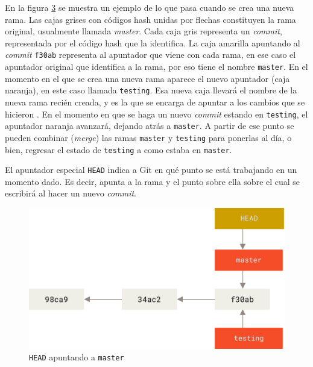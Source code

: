 \documentclass[spanish, 12pt, a4paper]{article}
\begin{document}
En la figura \protect\hyperlink{fig:two-branches}{3} se muestra un
ejemplo de lo que pasa cuando se crea una nueva rama. Las cajas grises
con códigos hash unidas por flechas constituyen la rama original,
usualmente llamada \emph{master}. Cada caja gris representa un
\emph{commit}, representada por el código hash que la identifica. La
caja amarilla apuntando al \emph{commit} \passthrough{\lstinline!f30ab!}
representa al apuntador que viene con cada rama, en ese caso el
apuntador original que identifica a la rama, por eso tiene el nombre
\passthrough{\lstinline!master!}. En el momento en el que se crea una
nueva rama aparece el nuevo apuntador (caja naranja), en este caso
llamada \passthrough{\lstinline!testing!}. Esa nueva caja llevará el
nombre de la nueva rama recién creada, y es la que se encarga de apuntar
a los cambios que se hicieron . En el momento en que se haga un nuevo
\emph{commit} estando en \passthrough{\lstinline!testing!}, el apuntador
naranja avanzará, dejando atrás a \passthrough{\lstinline!master!}. A
partir de ese punto se pueden combinar (\emph{merge}) las ramas
\passthrough{\lstinline!master!} y \passthrough{\lstinline!testing!}
para ponerlas al día, o bien, regresar el estado de
\passthrough{\lstinline!testing!} a como estaba en
\passthrough{\lstinline!master!}.

El apuntador especial \passthrough{\lstinline!HEAD!} indica a Git en qué
punto se está trabajando en un momento dado. Es decir, apunta a la rama
y el punto sobre ella sobre el cual se escribirá al hacer un nuevo
\emph{commit}.

\begin{figure}
\centering
\includegraphics{figs/head-to-master.png}
\caption{\passthrough{\lstinline!HEAD!} apuntando a
\passthrough{\lstinline!master!}}
\end{figure}
\end{document}
